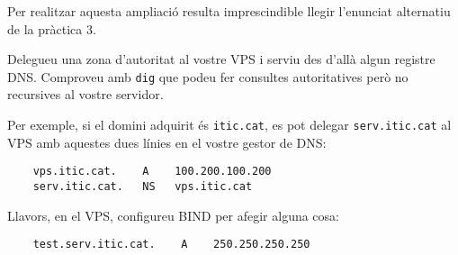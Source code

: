\documentclass{practicaitic}
\begin{document}
Per realitzar aquesta ampliació resulta imprescindible llegir l'enunciat
alternatiu de la pràctica 3.

\begin{tasca}
  Delegueu una zona d'autoritat al vostre VPS i serviu des d'allà algun
  registre DNS. Comproveu amb \verb|dig| que podeu fer consultes
  autoritatives però no recursives al vostre servidor.

  Per exemple, si el domini adquirit és \texttt{itic.cat}, es pot delegar
  \texttt{serv.itic.cat} al VPS amb aquestes dues línies en el vostre gestor
  de DNS:

  \begin{verbatim}
    vps.itic.cat.    A    100.200.100.200
    serv.itic.cat.   NS   vps.itic.cat
  \end{verbatim}

  Llavors, en el VPS, configureu BIND per afegir alguna cosa:

  \begin{verbatim}
    test.serv.itic.cat.    A    250.250.250.250
  \end{verbatim}
\end{tasca}



\end{document}
